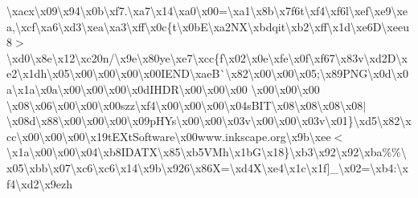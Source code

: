 \begin{DoxyCompactItemize}
\textbackslash{}xacx\textbackslash{}x09\textbackslash{}x94\textbackslash{}x0b\textbackslash{}xf7.\textbackslash{}xa7\textbackslash{}x14\textbackslash{}xa0\textbackslash{}x00=\textbackslash{}xa1\textbackslash{}x8b\textbackslash{}x7f6t\textbackslash{}xf4\textbackslash{}xf6l\textbackslash{}xef\textbackslash{}xe9\textbackslash{}xea,\textbackslash{}xcf\textbackslash{}xa6\textbackslash{}xd3\textbackslash{}xea\textbackslash{}xa3\textbackslash{}xff\textbackslash{}x0c\{t\textbackslash{}x0b\+E\textbackslash{}xa2\+N\+X\textbackslash{}xbdqit\textbackslash{}xb2\textbackslash{}xff\textbackslash{}x1d\textbackslash{}xe6\+D\textbackslash{}xeeu8$>$\textbackslash{}xd0\textbackslash{}x8e\textbackslash{}x12\textbackslash{}xc20n/\textbackslash{}x9e\textbackslash{}x80ye\textbackslash{}xe7\textbackslash{}xcc\{f\textbackslash{}x02\textbackslash{}x0e\textbackslash{}xfe\textbackslash{}x0f\textbackslash{}xf67\textbackslash{}x83v\textbackslash{}xd2\+D\textbackslash{}xe2\textbackslash{}x1dh\textbackslash{}x05\textbackslash{}x00\textbackslash{}x00\textbackslash{}x00\textbackslash{}x00\+I\+E\+N\+D\textbackslash{}xae\+B\`{}\textbackslash{}x82\textbackslash{}x00\textbackslash{}x00\textbackslash{}x05;\textbackslash{}x89\+P\+N\+G\textbackslash{}x0d\textbackslash{}x0a\textbackslash{}x1a\textbackslash{}x0a\textbackslash{}x00\textbackslash{}x00\textbackslash{}x00\textbackslash{}x0d\+I\+H\+D\+R\textbackslash{}x00\textbackslash{}x00\textbackslash{}x00 \textbackslash{}x00\textbackslash{}x00\textbackslash{}x00 \textbackslash{}x08\textbackslash{}x06\textbackslash{}x00\textbackslash{}x00\textbackslash{}x00szz\textbackslash{}xf4\textbackslash{}x00\textbackslash{}x00\textbackslash{}x00\textbackslash{}x04s\+B\+I\+T\textbackslash{}x08\textbackslash{}x08\textbackslash{}x08\textbackslash{}x08$\vert$\textbackslash{}x08d\textbackslash{}x88\textbackslash{}x00\textbackslash{}x00\textbackslash{}x00\textbackslash{}x09p\+H\+Ys\textbackslash{}x00\textbackslash{}x00\textbackslash{}x03v\textbackslash{}x00\textbackslash{}x00\textbackslash{}x03v\textbackslash{}x01\}\textbackslash{}xd5\textbackslash{}x82\textbackslash{}xcc\textbackslash{}x00\textbackslash{}x00\textbackslash{}x00\textbackslash{}x19t\+E\+Xt\+Software\textbackslash{}x00www.\+inkscape.\+org\textbackslash{}x9b\textbackslash{}xee$<$\textbackslash{}x1a\textbackslash{}x00\textbackslash{}x00\textbackslash{}x04\textbackslash{}xb8\+I\+D\+A\+T\+X\textbackslash{}x85\textbackslash{}xb5\+V\+Mh\textbackslash{}x1b\+G\textbackslash{}x18\}\textbackslash{}xb3\textbackslash{}x92\textbackslash{}x92\textbackslash{}xba\%\%\textbackslash{}x05\textbackslash{}xbb\textbackslash{}x07\textquotesingle{}\textbackslash{}xc6\textbackslash{}xc6\textbackslash{}x14\textbackslash{}x9b\textbackslash{}x926\textbackslash{}x86\+X=\textbackslash{}xd4\+X\textbackslash{}xe4\textbackslash{}x1c\textbackslash{}x1f\mbox{]}\+\_\+\textbackslash{}x02=\textbackslash{}xb4\+:\textbackslash{}xf4\textbackslash{}xd2\textbackslash{}x9ezh 
\end{DoxyCompactItemize}
